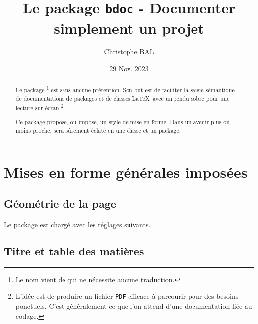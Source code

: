 \title{Le package \texttt{bdoc} - Documenter simplement un projet}
\author{Christophe BAL}
\date{29 Nov. 2023}

\maketitle

\begin{abstract}
Le package 
\footnote{
    Le nom vient de  qui ne nécessite aucune traduction.
}
est sans aucune prétention.
Son but est de faciliter la saisie sémantique de documentations de packages et de classes \LaTeX\ avec un rendu sobre pour une lecture sur écran
\footnote{
    L'idée est de produire un fichier \texttt{PDF} efficace à parcourir pour des besoins ponctuels. C'est généralement ce que l'on attend d'une documentation liée au codage.
}.


\begin{bdocnote}
 	Ce package propose, ou impose, un style de mise en forme.
	Dans un avenir plus ou moins proche,  sera sûrement éclaté en une classe et un package.
\end{bdocnote}
\end{abstract}
\section{Mises en forme générales imposées}

\subsection{Géométrie de la page}

Le package  est chargé avec les réglages suivants.

\begin{bdoclatex}[code]
\RequirePackage[
  top            = 2.5cm,
  bottom         = 2.5cm,
  left           = 2.5cm,
  right          = 2.5cm,
  marginparwidth = 2cm,
  marginparsep   = 2mm,
  heightrounded
]{geometry}
\end{bdoclatex}



\subsection{Titre et table des matières}

